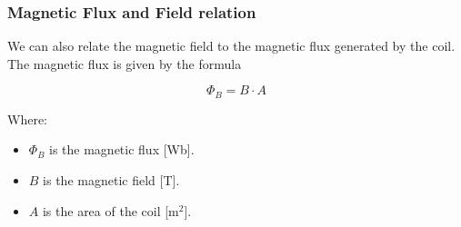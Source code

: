 \begin{samepage}
  \subsubsection{Magnetic Flux and Field relation}
  \nopagebreak

  We can also relate the magnetic field to the magnetic flux generated by the coil. The magnetic flux is given by the formula
  \nopagebreak

  \begin{equation*}
    \Phi_B=B \cdot A \label{eq: Magnetic_flux_&_field}
  \end{equation*}
  \nopagebreak

  Where:
  \begin{itemize}
    \item \( \Phi_B \) is the magnetic flux [Wb].
    \item \( B \) is the magnetic field [T].
    \item \( A \) is the area of the coil [m\(^2\)].
  \end{itemize}
\end{samepage}